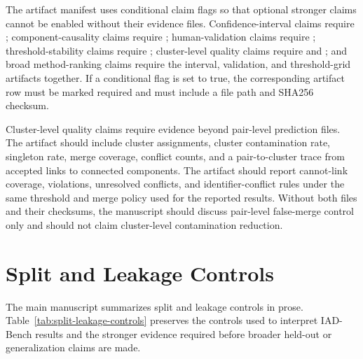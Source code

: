\documentclass[11pt]{article}
\begin{document}
The artifact manifest uses conditional claim flags so that optional stronger claims cannot be enabled without their evidence files. Confidence-interval claims require ; component-causality claims require ; human-validation claims require ; threshold-stability claims require ; cluster-level quality claims require  and ; and broad method-ranking claims require the interval, validation, and threshold-grid artifacts together. If a conditional flag is set to true, the corresponding artifact row must be marked required and must include a file path and SHA256 checksum.

Cluster-level quality claims require evidence beyond pair-level prediction files. The  artifact should include cluster assignments, cluster contamination rate, singleton rate, merge coverage, conflict counts, and a pair-to-cluster trace from accepted links to connected components. The  artifact should report cannot-link coverage, violations, unresolved conflicts, and identifier-conflict rules under the same threshold and merge policy used for the reported results. Without both files and their checksums, the manuscript should discuss pair-level false-merge control only and should not claim cluster-level contamination reduction.

\section{Split and Leakage Controls}

The main manuscript summarizes split and leakage controls in prose. Table~\ref{tab:split-leakage-controls} preserves the controls used to interpret IAD-Bench results and the stronger evidence required before broader held-out or generalization claims are made.
\end{document}
